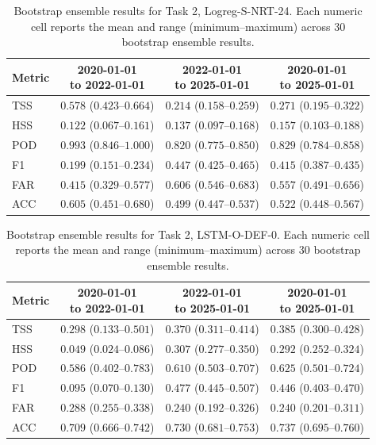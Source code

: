 \begin{table}[htbp]
\centering
\small
\caption{Bootstrap ensemble results for Task 2, Logreg-S-NRT-24. Each numeric cell reports the mean and range (minimum--maximum) across 30 bootstrap ensemble results.}
\label{tab:app-task2-logreg-s-nrt-24}
\begin{tabular}{lccc}
\toprule
Metric & \shortstack{2020-01-01\\to 2022-01-01} & \shortstack{2022-01-01\\to 2025-01-01} & \shortstack{2020-01-01\\to 2025-01-01} \\
\midrule
TSS & $0.578$ ($0.423$--$0.664$) & $0.214$ ($0.158$--$0.259$) & $0.271$ ($0.195$--$0.322$) \\
HSS & $0.122$ ($0.067$--$0.161$) & $0.137$ ($0.097$--$0.168$) & $0.157$ ($0.103$--$0.188$) \\
POD & $0.993$ ($0.846$--$1.000$) & $0.820$ ($0.775$--$0.850$) & $0.829$ ($0.784$--$0.858$) \\
F1 & $0.199$ ($0.151$--$0.234$) & $0.447$ ($0.425$--$0.465$) & $0.415$ ($0.387$--$0.435$) \\
FAR & $0.415$ ($0.329$--$0.577$) & $0.606$ ($0.546$--$0.683$) & $0.557$ ($0.491$--$0.656$) \\
ACC & $0.605$ ($0.451$--$0.680$) & $0.499$ ($0.447$--$0.537$) & $0.522$ ($0.448$--$0.567$) \\
\bottomrule
\end{tabular}
\end{table}
\clearpage

\begin{table}[htbp]
\centering
\small
\caption{Bootstrap ensemble results for Task 2, LSTM-O-DEF-0. Each numeric cell reports the mean and range (minimum--maximum) across 30 bootstrap ensemble results.}
\label{tab:app-task2-lstm-o-def-0}
\begin{tabular}{lccc}
\toprule
Metric & \shortstack{2020-01-01\\to 2022-01-01} & \shortstack{2022-01-01\\to 2025-01-01} & \shortstack{2020-01-01\\to 2025-01-01} \\
\midrule
TSS & $0.298$ ($0.133$--$0.501$) & $0.370$ ($0.311$--$0.414$) & $0.385$ ($0.300$--$0.428$) \\
HSS & $0.049$ ($0.024$--$0.086$) & $0.307$ ($0.277$--$0.350$) & $0.292$ ($0.252$--$0.324$) \\
POD & $0.586$ ($0.402$--$0.783$) & $0.610$ ($0.503$--$0.707$) & $0.625$ ($0.501$--$0.724$) \\
F1 & $0.095$ ($0.070$--$0.130$) & $0.477$ ($0.445$--$0.507$) & $0.446$ ($0.403$--$0.470$) \\
FAR & $0.288$ ($0.255$--$0.338$) & $0.240$ ($0.192$--$0.326$) & $0.240$ ($0.201$--$0.311$) \\
ACC & $0.709$ ($0.666$--$0.742$) & $0.730$ ($0.681$--$0.753$) & $0.737$ ($0.695$--$0.760$) \\
\bottomrule
\end{tabular}
\end{table}
\clearpage

